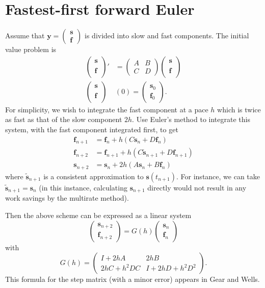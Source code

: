\documentclass[10pt]{article}
\begin{document}

\section*{Fastest-first forward Euler}

Assume that $\mathbf{y} = \begin{pmatrix} \mathbf{s}
  \\ \mathbf{f} \end{pmatrix}$ is divided into slow and fast
components. The initial value problem is
\newcommand{\slowfast}[1][]{\begin{pmatrix} \mathbf{s}_{#1}
\\ \mathbf{f}_{#1} \end{pmatrix}}
%
\begin{align*}
 \slowfast' &= \begin{pmatrix} A & B \\ C & D \end{pmatrix} \slowfast
 \\ \slowfast&(0) = \slowfast[0].
\end{align*}
%
For simplicity, we wish to integrate the fast component at a pace $h$
which is twice as fast as that of the slow component $2h$.
%
Use Euler's method to integrate this system, with the fast component
integrated first, to get
%
\begin{align*}
  \mathbf{f}_{n+1} &=
      \mathbf{f}_n + h(C \mathbf{s}_n + D \mathbf{f}_n) \\
  \mathbf{f}_{n+2} &=
      \mathbf{f}_{n+1} + h(C \mathbf{\tilde{s}}_{n+1} + D \mathbf{f}_{n+1}) \\
  \mathbf{s}_{n+2} &= \mathbf{s}_n + 2h(A \mathbf{s}_n + B \mathbf{f}_n)
\end{align*}
%
where $\mathbf{\tilde{s}}_{n+1}$ is a consistent approximation to
$\mathbf{s}(t_{n+1})$. For instance, we can take
$\mathbf{\tilde{s}}_{n+1} = \mathbf{s}_n$ (in this instance, calculating
$\mathbf{s}_{n+1}$ directly would not result in any work savings by the
multirate method).

Then the above scheme can be expressed as a linear system
%
\[ \slowfast[n+2] = G(h) \slowfast[n] \]
%
with
%
\[ G(h) = \begin{pmatrix} I + 2hA & 2hB \\
  2hC + h^2DC & I + 2hD + h^2D^2 \end{pmatrix}. \]
%
This formula for the step matrix (with a minor error) appears in Gear
and Wells.
\end{document}
